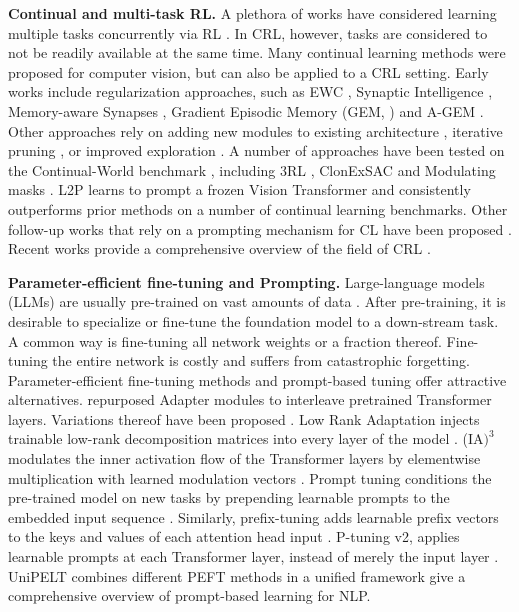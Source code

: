 \documentclass{article}
\begin{document}
\textbf{Continual and multi-task RL.}
A plethora of works have considered learning multiple tasks concurrently via RL \citep{Tanaka:03,Rusu:policy:16,Borsa:16,Rajeswaran:17,Bsat:17,Andreas:17,Deramo:20,Yu:20,Igl:20,Sodhani:21}.
In CRL, however, tasks are considered to not be readily available at the same time.
Many continual learning methods were proposed for computer vision, but can also be applied to a CRL setting. 
Early works include regularization approaches, such as EWC \citep{Kirkpatrick:17}, Synaptic Intelligence \citep{Zenke:17}, Memory-aware Synapses \citep{Aljundi:18}, Gradient Episodic Memory (GEM, \citealp{Lopez:17}) and A-GEM \citep{Chaudhry:18}. 
Other approaches rely on adding new modules to existing architecture \citep{Rusu:16}, iterative pruning \citep{Mallya:18}, or improved exploration \citep{Steinparz:22}. 
A number of approaches have been tested on the Continual-World benchmark \citep{Wolczyk:21}, including 3RL \citep{Caccia:22}, ClonExSAC \citep{Wolczyk:22} and Modulating masks \citep{Ben:22}. 
L2P \citep{Wang:22} learns to prompt a frozen Vision Transformer \citep{Dosovitskiy:21} and consistently outperforms prior methods on a number of continual learning benchmarks. 
Other follow-up works that rely on a prompting mechanism for CL have been proposed \citep{Wang_dual:22, Smith:22, Razdaibiedina:23}. 
Recent works provide a comprehensive overview of the field of CRL \citep{Hadsell:20,Lesort:20,Khetarpal:22,Baker:23}. 

\textbf{Parameter-efficient fine-tuning and Prompting.} Large-language models (LLMs) are usually pre-trained on vast amounts of data \citep{Devlin:18,Radford:19,Brown:20}. 
After pre-training, it is desirable to specialize or fine-tune the foundation model \citep{Bommasani:21} to a down-stream task. 
A common way is fine-tuning all network weights or a fraction thereof. 
Fine-tuning the entire network is costly and suffers from catastrophic forgetting.
Parameter-efficient fine-tuning methods and prompt-based tuning offer attractive alternatives. 
\citet{Houlsby:19} repurposed Adapter modules \citep{Rebuffi:17} to interleave pretrained Transformer layers. 
Variations thereof have been proposed \citep{Bapna:19,Pfeiffer:20,Pfeiffer:20a,Karimi:21}. 
Low Rank Adaptation injects trainable low-rank decomposition matrices into every layer of the model \citep{Hu:21}.
(IA$\text{)}^3$ modulates the inner activation flow of the Transformer layers by elementwise multiplication with learned modulation vectors \citep{Liu:22}.
Prompt tuning conditions the pre-trained model on new tasks by prepending learnable prompts to the embedded input sequence \citep{Lester:21}. 
Similarly, prefix-tuning adds learnable prefix vectors to the keys and values of each attention head input \citep{Xiang:21}.
P-tuning v2, applies learnable prompts at each Transformer layer, instead of merely the input layer \citep{Liu:21a}.
UniPELT combines different PEFT methods in a unified framework \citep{Mao:22}
\citet{Liu:21} give a comprehensive overview of prompt-based learning for NLP.
\end{document}
